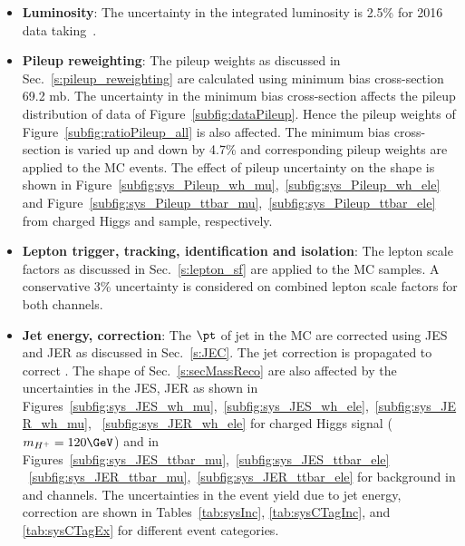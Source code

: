 \begin{itemize}
\item {\bf Luminosity}: The uncertainty in the integrated luminosity is 2.5\% for 2016 data taking~\cite{CMS-PAS-LUM-17-001}. 
\item {\bf Pileup reweighting}: The pileup weights as discussed in Sec.~\ref{s:pileup_reweighting}
    are calculated using minimum bias cross-section 69.2 mb. The uncertainty in the minimum 
    bias cross-section affects the pileup distribution of data of Figure~\ref{subfig:dataPileup}. 
    Hence the pileup weights of Figure~\ref{subfig:ratioPileup_all} is also affected. The 
    minimum bias cross-section is varied up and down by 4.7\% and corresponding pileup
    weights are applied to the MC events. The effect of pileup uncertainty on the \mjj
    shape is shown in Figure~\ref{subfig:sys_Pileup_wh_mu},~\ref{subfig:sys_Pileup_wh_ele} and
    Figure~\ref{subfig:sys_Pileup_ttbar_mu},~\ref{subfig:sys_Pileup_ttbar_ele} from charged Higgs
    and \ttjets sample, respectively.

\item {\bf Lepton trigger, tracking, identification and isolation}: 
    The lepton scale factors as discussed in Sec.~\ref{s:lepton_sf} are applied to the MC
    samples. A conservative 3\% uncertainty is considered on combined lepton scale factors
    for both channels. 

\item {\bf Jet energy, \MET correction}: The $\pt$ of jet in the MC are corrected using JES 
    and JER as discussed in Sec.~\ref{s:JEC}. The jet correction is propagated to correct 
    \MET. The \mjj shape of Sec.~\ref{s:secMassReco} are also affected by the 
    uncertainties in the JES, JER as shown in 
    Figures~\ref{subfig:sys_JES_wh_mu},~\ref{subfig:sys_JES_wh_ele},~\ref{subfig:sys_JER_wh_mu},
    ~\ref{subfig:sys_JER_wh_ele} for charged Higgs signal ($m_{H^+} = 120 \GeV$) and in 
     Figures~\ref{subfig:sys_JES_ttbar_mu},~\ref{subfig:sys_JES_ttbar_ele} 
    ~\ref{subfig:sys_JER_ttbar_mu},~\ref{subfig:sys_JER_ttbar_ele} for \ttjets 
    background in \mujets and \ejets channels. The uncertainties in the event 
    yield due to jet energy, \MET correction are shown in 
    Tables~\ref{tab:sysInc}, \ref{tab:sysCTagInc}, and \ref{tab:sysCTagEx} for different event categories.


\end{itemize}
